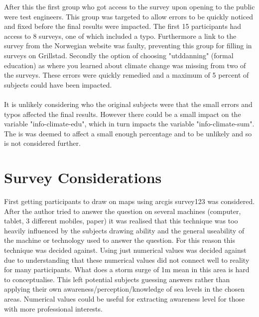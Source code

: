 After this the first group who got access to the survey upon opening to the public were test engineers. This group was targeted to allow errors to be quickly noticed and fixed before the final results were impacted. The first 15 participants had access to 8 surveys, one of which included a typo. Furthermore a link to the survey from the Norwegian website was faulty, preventing this group for filling in surveys on Grillstad. Secondly the option of choosing "utddanning" (formal education) as where you learned about climate change was missing from two of the surveys. These errors were quickly remedied and a maximum of 5 percent of subjects could have been impacted. 

\paragraph{}
It is unlikely considering who the original subjects were that the small errors and typos affected the final results. However there could be a small impact on the variable "info-climate-edu", which in turn impacts the variable "info-climate-sum". The is was deemed to affect a small enough percentage and to be unlikely and so is not considered further.



\section{Survey Considerations}

First getting participants to draw on maps using arcgis survey123 was considered. After the author tried to answer the question on several machines (computer, tablet, 3 different mobiles, paper) it was realised that this technique was too heavily influenced by the subjects drawing ability and the general useability of the machine or technology used to answer the question. For this reason this technique was decided against.
Using just numerical values was decided against due to understanding that these numerical values did not connect well to reality for many participants. What does a storm surge of 1m mean in this area is hard to conceptualise. This left potential subjects guessing answers rather than applying their own awareness/perception/knowledge of sea levels in the chosen areas. Numerical values could be useful for extracting awareness level for those with more professional interests.
\paragraph{}


